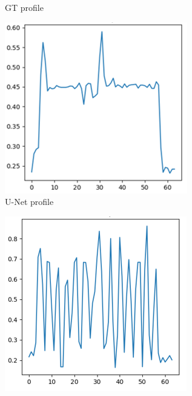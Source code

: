 \documentclass[conference]{IEEEtran}
\begin{document}
\begin{figure}[h!]
\begin{subfigure}[b]{0.15\textwidth}
        \caption{GT profile}
        \label{fig:gt_circle_cut}
    \end{subfigure}
    \begin{subfigure}[b]{0.153\textwidth}
        \centering
        \includegraphics[width=\textwidth]{images/unet_circle_cut.png}
        \caption{U-Net profile}
        \label{fig:unet_circle_cut}
    \end{subfigure}
    \begin{subfigure}[b]{0.149\textwidth}
        \centering
        \includegraphics[width=\textwidth]{images/rcan_circle_cut.png}

\end{subfigure}
\end{figure}
\end{document}
